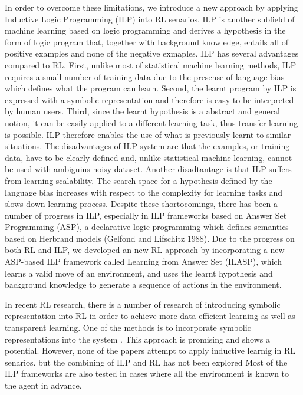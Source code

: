 In order to overcome these limitations, we introduce a new approach by applying Inductive Logic Programming (ILP) into RL senarios. 
ILP is another subfield of machine learning based on logic programming and derives a hypothesis in the form of logic program that, together with background knowledge, entails all of positive examples and none of the negative exmaples. 
ILP has several advantages compared to RL. 
First, unlike most of statistical machine learning methods, ILP requires a small number of training data due to the presense of language bias which defines what the program can learn.
Second, the learnt program by ILP is expressed with a symbolic representation and therefore is easy to be interpreted by human users.
Third, since the learnt hypothesis is a abstract and general notion, it can be easily applied to a different learning task, thus transfer learning is possible. ILP therefore enables the use of what is previously learnt to similar situations.
The disadvantages of ILP system are that the examples, or training data, have to be clearly defined and, unlike statistical machine learning, cannot be used with ambiguius noisy dataset.
Another disadtantage is that ILP suffers from learning scalability. The search space for a hypothesis defined by the language bias increases with respect to the complexity for learning tasks and slows down learning process.
Despite these shortocomings, there has been a number of progress in ILP, especially in ILP frameworks based on Answer Set Programming (ASP), a declarative logic programming which defines semantics based on Herbrand models (Gelfond and Lifschitz 1988).
Due to the progress on both RL and ILP, we developed an new RL approach by incorporating a new ASP-based ILP framework called Learning from Answer Set (ILASP), which learns a valid move of an environment, 
and uses the learnt hypothesis and background knowledge to generate a sequence of actions in the environment. 

In recent RL research, there is a number of research of introducing symbolic representation into RL in order to achieve more data-efficient learning as well as transparent learning. 
One of the methods is to incorporate symbolic representations into the system \cite{Garnelo2016}. This approach is promising and shows a potential.
However, none of the papers attempt to apply inductive learnig in RL senarios. 
but the combining of ILP and RL has not been explored
Most of the ILP frameworks are also tested in cases where all the environment is known to the agent in advance. 

